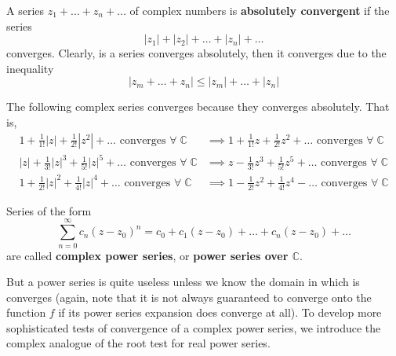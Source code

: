  \begin{definition}
    A series $z_1 + \ldots + z_n + \ldots$ of complex numbers is \textbf{absolutely convergent} if the series
    \[|z_1| + |z_2| + \ldots + |z_n| + \ldots\]
    converges. Clearly, is a series converges absolutely, then it converges due to the inequality
    \[|z_m + \ldots + z_n| \leq |z_m| + \ldots + |z_n|\]
  \end{definition}

  \begin{example}
    The following complex series converges because they converges absolutely. That is, 
    \begin{align*}
        1 + \frac{1}{1!}|z| + \frac{1}{2!}|z^2| + \ldots \text{ converges } \forall \; \mathbb{C} & \implies 1 + \frac{1}{1!}z + \frac{1}{2!}z^2 + \ldots \text{ converges } \forall \; \mathbb{C} \\
        |z| + \frac{1}{3!}|z|^3 + \frac{1}{5!}|z|^5 + \ldots \text{ converges } \forall \; \mathbb{C}  & \implies z - \frac{1}{3!} z^3 + \frac{1}{5!}z^5 + \ldots \text{ converges } \forall \; \mathbb{C} \\
        1 + \frac{1}{2!}|z|^2 + \frac{1}{4!} |z|^4 + \ldots \text{ converges }  \forall \; \mathbb{C} & \implies 1 - \frac{1}{2!}z^2 + \frac{1}{4!} z^4 - \ldots \text{ converges }  \forall \; \mathbb{C} 
    \end{align*}
  \end{example}

  \begin{definition}
    Series of the form 
    \[\sum_{n=0}^\infty c_n (z - z_0)^n = c_0 + c_1 (z - z_0) + \ldots + c_n (z - z_0) + \ldots\]
    are called \textbf{complex power series}, or \textbf{power series over $\mathbb{C}$}. 
  \end{definition}

  But a power series is quite useless unless we know the domain in which is converges (again, note that it is not always guaranteed to converge onto the function $f$ if its power series expansion does converge at all). To develop more sophisticated tests of convergence of a complex power series, we introduce the complex analogue of the root test for real power series. 

